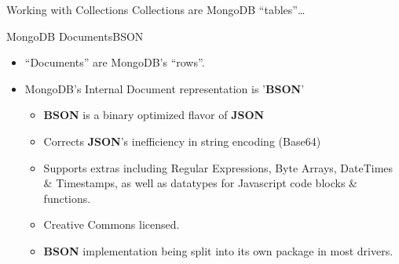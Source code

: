 \documentclass{beamer}
\begin{document}
\begin{frame}{Working with Collections}
    Collections are MongoDB ``tables''\dots
    \pause
\end{frame}

\begin{frame}{MongoDB Documents}{BSON}
    \begin{itemize}
        \item ``Documents'' are MongoDB's ``rows''. 
        \item MongoDB's Internal Document representation is '{\bf BSON}'
        \begin{itemize}
            \item {\bf BSON} is a binary optimized flavor of {\bf JSON}
            \item Corrects {\bf JSON}'s inefficiency in string encoding (Base64)
            \item Supports extras including Regular Expressions, Byte Arrays, DateTimes \& Timestamps, as well as datatypes for Javascript code blocks \& functions.
            \item Creative Commons licensed.
            \item {\bf BSON} implementation being split into its own package in most drivers.
        \end{itemize}
    \end{itemize}
\end{frame}
\end{document}
